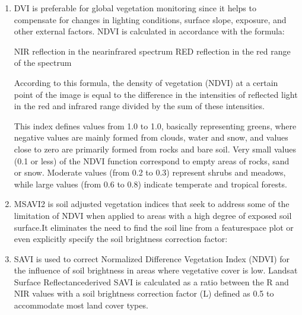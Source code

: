 \documentclass[letterpaper,10pt,english]{sphinxmanual}
\begin{document}
\begin{enumerate}
%
\item {} 
\sphinxAtStartPar
{}

\sphinxAtStartPar
DVI is preferable for global vegetation monitoring since it helps to compensate for
changes in lighting conditions, surface slope, exposure, and other external factors.
NDVI is calculated in accordance with the formula:


\sphinxAtStartPar
NIR \textendash{} reflection in the near\sphinxhyphen{}infrared spectrum
RED \textendash{} reflection in the red range of the spectrum

\sphinxAtStartPar
According to this formula, the density of vegetation (NDVI) at a certain point of the
image is equal to the difference in the intensities of reflected light in the red and
infrared range divided by the sum of these intensities.

\sphinxAtStartPar
This index defines values ​​from \sphinxhyphen{}1.0 to 1.0, basically representing greens, where negative
values ​​are mainly formed from clouds, water and snow, and values ​​close to zero are
primarily formed from rocks and bare soil. Very small values ​​(0.1 or less) of the NDVI
function correspond to empty areas of rocks, sand or snow. Moderate values ​​(from 0.2 to 0.3)
represent shrubs and meadows, while large values ​​(from 0.6 to 0.8) indicate temperate and
tropical forests.

\item {} 
\sphinxAtStartPar
{}

\sphinxAtStartPar
MSAVI2 is soil adjusted vegetation indices that seek to address some of the limitation of
NDVI when applied to areas with a high degree of exposed soil surface.It eliminates the need
to find the soil line from a feature\sphinxhyphen{}space plot or even explicitly specify the soil brightness
correction factor:


\item {} 
\sphinxAtStartPar
{}

\sphinxAtStartPar
SAVI is used to correct Normalized Difference Vegetation Index (NDVI) for the influence of
soil brightness in areas where vegetative cover is low. Landsat Surface Reflectance\sphinxhyphen{}derived
SAVI is calculated as a ratio between the R and NIR values with a soil brightness correction
factor (L) defined as 0.5 to accommodate most land cover types.


\end{enumerate}
\end{document}

